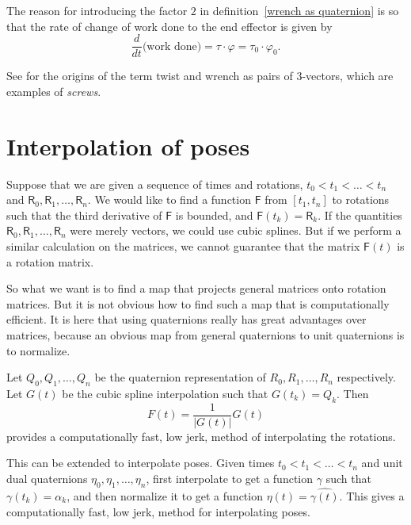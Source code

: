 \documentclass[reqno,12pt]{amsart}
\begin{document}
The reason for introducing the factor $2$ in definition~\eqref{wrench as quaternion} is so that the rate of change of work done to the end effector is given by
\begin{equation}
\label{dot h tau varphi}
\frac{d}{dt} \text{(work done)} = \tau \cdot \varphi = \tau_0 \cdot \varphi_0 .
\end{equation}

See \cite{ball} for the origins of the term twist and wrench as pairs of 3-vectors, which are examples of \emph{screws}.

\section{Interpolation of poses}

Suppose that we are given a sequence of times and rotations, $t_0 < t_1 < \dots < t_n$ and $\mathsf R_0, \mathsf R_1, \dots, \mathsf R_n$.  We would like to find a function $\mathsf F$ from $[t_1,t_n]$ to rotations such that the third derivative of $\mathsf F$ is bounded, and $\mathsf F(t_k) = \mathsf R_k$.  If the quantities $\mathsf R_0, \mathsf R_1, \dots, \mathsf R_n$ were merely vectors, we could use cubic splines.  But if we perform a similar calculation on the matrices, we cannot guarantee that the matrix $\mathsf F(t)$ is a rotation matrix.

So what we want is to find a map that projects general matrices onto rotation matrices.  But it is not obvious how to find such a map that is computationally efficient.  It is here that using quaternions really has great advantages over matrices, because an obvious map from general quaternions to unit quaternions is to normalize.

Let $Q_0,Q_1,\dots,Q_n$ be the quaternion representation of $R_0, R_1, \dots, R_n$ respectively.  Let $G(t)$ be the cubic spline interpolation such that $G(t_k) = Q_k$.  Then
\begin{equation}
F(t) = \frac1{|G(t)|} G(t)
\end{equation}
provides a computationally fast, low jerk, method of interpolating the rotations.

This can be extended to interpolate poses.  Given times $t_0<t_1<\dots <t_n$ and unit dual quaternions $\eta_0, \eta_1, \dots, \eta_n$, first interpolate to get a function $\gamma$ such that $\gamma(t_k) = \alpha_k$, and then normalize it to get a function $\eta(t) = \widehat{\gamma(t)}$.  This gives a computationally fast, low jerk, method for interpolating poses.
\end{document}
